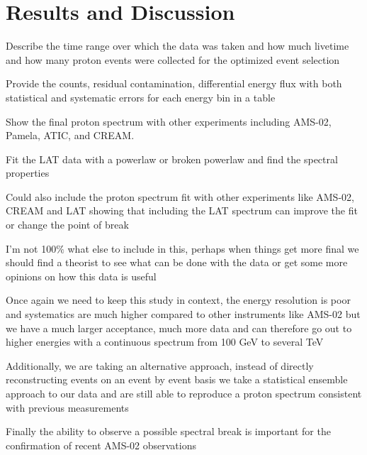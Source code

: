 \documentclass{article}
\begin{document}
\section{Results and Discussion}
	\begin{myEnumerate}
		\item Describe the time range over which the data was taken and how much livetime and how many proton events were collected for the optimized event selection
		\item Provide the counts, residual contamination, differential energy flux with both statistical and systematic errors for each energy bin in a table
		\item Show the final proton spectrum with other experiments including AMS-02, Pamela, ATIC, and CREAM.  
		\item Fit the LAT data with a powerlaw or broken powerlaw and find the spectral properties
		\item Could also include the proton spectrum fit with other experiments like AMS-02, CREAM and LAT showing that including the LAT spectrum can improve the fit or change the point of break
		\item I'm not 100$\%$ what else to include in this, perhaps when things get more final we should find a theorist to see what can be done with the data or get some more opinions on how this data is useful
		\item Once again we need to keep this study in context, the energy resolution is poor and systematics are much higher compared to other instruments like AMS-02 but we have a much larger acceptance, much more data and can therefore go out to higher energies with a continuous spectrum from 100 GeV to several TeV
		\item Additionally, we are taking an alternative approach, instead of directly reconstructing events on an event by event basis we take a statistical ensemble approach to our data and are still able to reproduce a proton spectrum consistent with previous measurements
		\item Finally the ability to observe a possible spectral break is important for the confirmation of recent AMS-02 observations
	\end{myEnumerate}
\end{document}
